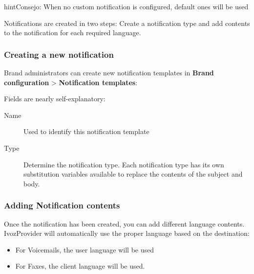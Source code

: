 \documentclass[letterpaper,10pt,spanish]{sphinxmanual}
\begin{document}
\begin{notice}{hint}{Consejo:}
When no custom notification is configured, default ones will be used
\end{notice}

Notifications are created in two steps: Create a notification type and add contents to the notification for each
required language.


\subsubsection{Creating a new notification}
\label{administration_portal/brand/settings/notification_templates:creating-a-new-notification}
Brand administrators can create new notification templates in \textbf{Brand configuration} \textgreater{} \textbf{Notification templates}:

Fields are nearly self-explanatory:
\begin{description}
\item[{Name}] \leavevmode{}\label{administration_portal/brand/settings/notification_templates:term-name}
Used to identify this notification template

\item[{Type}] \leavevmode{}\label{administration_portal/brand/settings/notification_templates:term-type}
Determine the notification type. Each notification type has its own substitution variables available to replace
the contents of the subject and body.

\end{description}


\subsubsection{Adding Notification contents}
\label{administration_portal/brand/settings/notification_templates:adding-notification-contents}
Once the notification has been created, you can add different language contents. IvozProvider will automatically use
the proper language based on the destination:
\begin{itemize}
\item {} 
For Voicemails, the user language will be used

\item {} 
For Faxes, the client language will be used.

\end{itemize}
\end{document}
